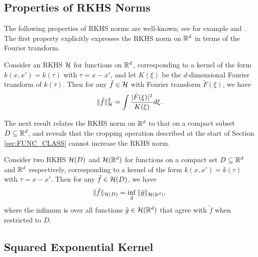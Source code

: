 \documentclass[english,onecolumn,final,11pt]{IEEEtran} %
\begin{document}
\subsection{Properties of RKHS Norms}

The following properties of RKHS norms are well-known; see for example \cite[Sec.~1.5]{Aro50} and \cite[Sec.~3]{Bul11}.  The first property explicitly expresses the RKHS norm on $\mathbb{R}^d$ in terms of the Fourier transform.

\begin{lemma} \emph{\cite[Sec.~1.5]{Aro50}} \label{lem:norm}
    Consider an RKHS $\mathcal{H}$ for functions on $\mathbb{R}^d$, corresponding to a kernel of the form $k(x,x') = k(\tau)$ with $\tau = x - x'$, and let $K(\xi)$ be the $d$-dimensional Fourier transform of $k(\tau)$.  Then for any $\tilde{f} \in \mathcal{H}$ with Fourier transform $\tilde{F}(\xi)$, we have
    \begin{equation}
        \|\tilde{f}\|_{\mathcal{H}}^2 = \int \frac{ |\tilde{F}(\xi)|^2 }{ K(\xi) } d\xi.
    \end{equation}
\end{lemma}

The next result relates the RKHS norm on $\mathbb{R}^d$ to that on a compact subset $D \subseteq \mathbb{R}^d$, and reveals that the cropping operation described at the start of Section \ref{sec:FUNC_CLASS} cannot increase the RKHS norm.

\begin{lemma} \emph{\cite[Sec.~1.5]{Aro50}} \label{lem:crop}
    Consider two RKHS $\mathcal{H}(D)$ and $\mathcal{H}(\mathbb{R}^d)$ for functions on a compact set $D \subseteq \mathbb{R}^d$ and $\mathbb{R}^d$ respectively, corresponding to a kernel of the form $k(x,x') = k(\tau)$ with $\tau = x - x'$.  Then for any $\tilde{f} \in \mathcal{H}(D)$, we have
    \begin{equation}
        \|\tilde{f}\|_{\mathcal{H}(D)} = \inf_{\tilde{g}} \|\tilde{g}\|_{\mathcal{H}(\mathbb{R}^d)},
    \end{equation}
    where the infimum is over all functions $\tilde{g} \in \mathcal{H}(\mathbb{R}^d)$ that agree with $\tilde{f}$ when restricted to $D$.
\end{lemma}

\subsection{Squared Exponential Kernel}
\end{document}
